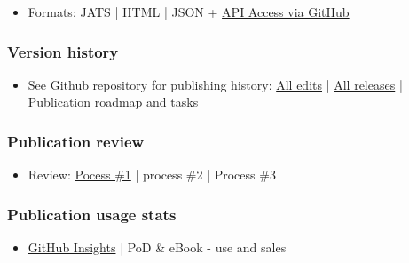 \documentclass{article}
\begin{document}
\begin{itemize}
\item Formats: JATS | HTML | JSON + \href{https://docs.github.com/en/rest/guides/getting-started-with-the-rest-api?apiVersion=2022-11-28}{API Access via GitHub}


\end{itemize}

\subsubsection{Version history}\label{H288689}


\begin{itemize}
\item See Github repository for publishing history: \href{https://github.com/a-machine/report-demo/commits/main}{All edits} | \href{https://github.com/a-machine/report-demo/releases}{All releases} | \href{https://github.com/orgs/a-machine/projects/1/views/1?layout=roadmap}{Publication roadmap and tasks}


\end{itemize}

\subsubsection{Publication review }\label{H3767141}


\begin{itemize}
\item Review: \href{https://github.com/orgs/a-machine/projects/1/views/2?filterQuery=Peer+review}{Pocess \#1} | process \#2 | Process \#3


\end{itemize}

\subsubsection{Publication usage stats}\label{H3133638}


\begin{itemize}
\item \href{https://github.com/a-machine/report-demo/graphs/traffic}{GitHub Insights} | PoD \& eBook - use and sales


\end{itemize}
\end{document}

